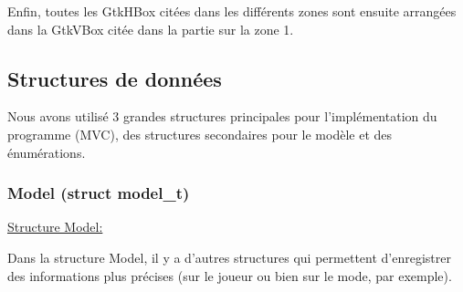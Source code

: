 \documentclass[a4paper, 11pt, oneside]{article}
\begin{document}
Enfin, toutes les GtkHBox citées dans les différents zones sont ensuite arrangées dans la GtkVBox citée dans la partie sur la zone 1.

\subsection{Structures de données}

Nous avons utilisé 3 grandes structures principales pour l'implémentation du programme (MVC), des structures secondaires pour le modèle et des énumérations.

\subsubsection{Model (struct model\_t)}

\hspace{5mm}
\underline{Structure Model:}



\hspace{5mm}

Dans la structure Model, il y a d'autres structures qui permettent d'enregistrer des informations plus précises (sur le joueur ou bien sur le mode, par exemple).
\end{document}

